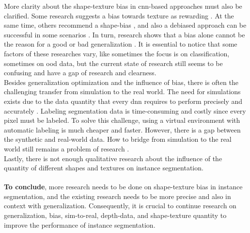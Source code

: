 		More clarity about the shape-texture bias in \ac{cnn}-based approaches must also be clarified. Some research suggests a bias towards texture as rewarding \cite{Qiu2024}. At the same time, others recommend a shape-bias \cite{Geihors2019}, and also a debiased approach can be successful in some scenarios \cite{Li2021}\cite{Co2021}\cite{Chung2023}. In turn, research shows that a bias alone cannot be the reason for a good or bad generalization \cite{Gavrikov2024}. It is essential to notice that some factors of these researches vary, like sometimes the focus is on classification, sometimes on \ac{ood} data, but the current state of research still seems to be confusing and have a gap of research and clearness.\\
		Besides generalization optimization and the influence of bias, there is often the challenging transfer from simulation to the real world. The need for simulations exists due to the data quantity that every \ac{dnn} requires to perform precisely and accurately \cite {Uchida2016}\cite{Alzubaidi2021}\cite{Csurka2023}. Labeling segmentation data is time-consuming and costly since every pixel must be labeled. To solve this challenge, using a virtual environment with automatic labeling is much cheaper and faster. However, there is a gap between the synthetic and real-world data. How to bridge from simulation to the real world still remains a problem of research \cite{Doersch2019}.\\
		Lastly, there is not enough qualitative research about the influence of the quantity of different shapes and textures on instance segmentation.\\
		\\
		\textbf{To conclude}, more research needs to be done on shape-texture bias in instance segmentation, and the existing research needs to be more precise and also in context with generalization. Consequently, it is crucial to continue research on generalization, bias, sim-to-real, depth-data, and shape-texture quantity to improve the performance of instance segmentation.
		
	
	
